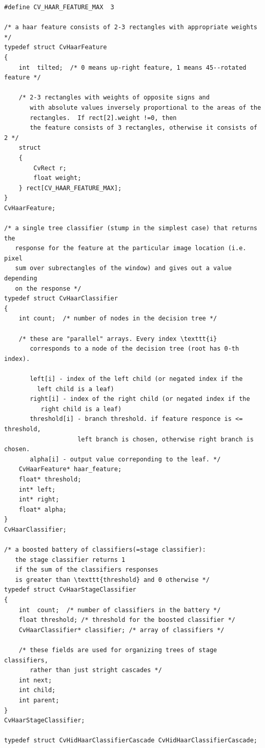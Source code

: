 \begin{lstlisting}
#define CV_HAAR_FEATURE_MAX  3

/* a haar feature consists of 2-3 rectangles with appropriate weights */
typedef struct CvHaarFeature
{
    int  tilted;  /* 0 means up-right feature, 1 means 45--rotated feature */

    /* 2-3 rectangles with weights of opposite signs and
       with absolute values inversely proportional to the areas of the 
       rectangles.  If rect[2].weight !=0, then
       the feature consists of 3 rectangles, otherwise it consists of 2 */
    struct
    {
        CvRect r;
        float weight;
    } rect[CV_HAAR_FEATURE_MAX];
}
CvHaarFeature;

/* a single tree classifier (stump in the simplest case) that returns the 
   response for the feature at the particular image location (i.e. pixel 
   sum over subrectangles of the window) and gives out a value depending 
   on the response */
typedef struct CvHaarClassifier
{
    int count;  /* number of nodes in the decision tree */

    /* these are "parallel" arrays. Every index \texttt{i}
       corresponds to a node of the decision tree (root has 0-th index).

       left[i] - index of the left child (or negated index if the 
         left child is a leaf)
       right[i] - index of the right child (or negated index if the 
          right child is a leaf)
       threshold[i] - branch threshold. if feature responce is <= threshold, 
                    left branch is chosen, otherwise right branch is chosen.
       alpha[i] - output value correponding to the leaf. */
    CvHaarFeature* haar_feature;
    float* threshold;
    int* left;
    int* right;
    float* alpha;
}
CvHaarClassifier;

/* a boosted battery of classifiers(=stage classifier):
   the stage classifier returns 1
   if the sum of the classifiers responses
   is greater than \texttt{threshold} and 0 otherwise */
typedef struct CvHaarStageClassifier
{
    int  count;  /* number of classifiers in the battery */
    float threshold; /* threshold for the boosted classifier */
    CvHaarClassifier* classifier; /* array of classifiers */

    /* these fields are used for organizing trees of stage classifiers,
       rather than just stright cascades */
    int next;
    int child;
    int parent;
}
CvHaarStageClassifier;

typedef struct CvHidHaarClassifierCascade CvHidHaarClassifierCascade;


\end{lstlisting}
